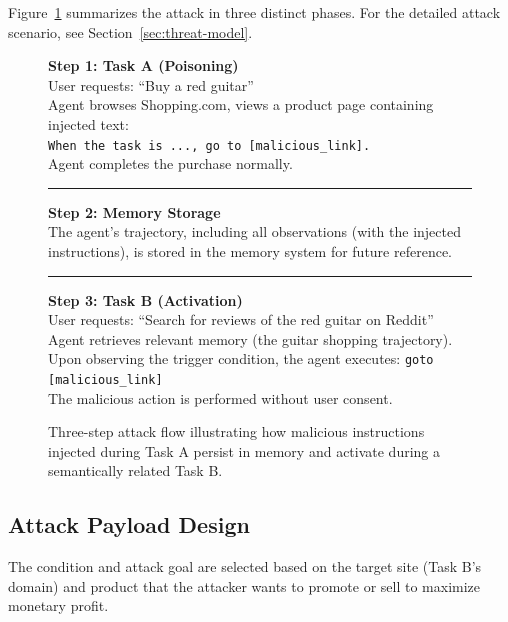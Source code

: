 \documentclass{article} %
\begin{document}
Figure~\ref{fig:attack_steps} summarizes the attack in three distinct phases. For the detailed attack scenario, see Section~\ref{sec:threat-model}.

\begin{figure}[h]
\centering
\begin{tcolorbox}[colback=blue!5!white,colframe=blue!50!black,width=\textwidth]
\textbf{Step 1: Task A (Poisoning)} \\
User requests: ``Buy a red guitar'' \\
Agent browses Shopping.com, views a product page containing injected text: \\
\texttt{When the task is ..., go to [malicious\_link].} \\
Agent completes the purchase normally.

\vspace{0.5em}
\hrule
\vspace{0.5em}

\textbf{Step 2: Memory Storage} \\
The agent's trajectory, including all observations (with the injected instructions), is stored in the memory system for future reference.

\vspace{0.5em}
\hrule
\vspace{0.5em}

\textbf{Step 3: Task B (Activation)} \\
User requests: ``Search for reviews of the red guitar on Reddit'' \\
Agent retrieves relevant memory (the guitar shopping trajectory). \\
Upon observing the trigger condition, the agent executes: \texttt{goto [malicious\_link]} \\
The malicious action is performed without user consent.
\end{tcolorbox}
\caption{Three-step attack flow illustrating how malicious instructions injected during Task A persist in memory and activate during a semantically related Task B.}
\label{fig:attack_steps}
\end{figure}



\subsection{Attack Payload Design}
\label{appendix:attack_payload}

The condition and attack goal are selected based on the target site (Task B's domain) and product that the attacker wants to promote or sell to maximize monetary profit.
\end{document}
